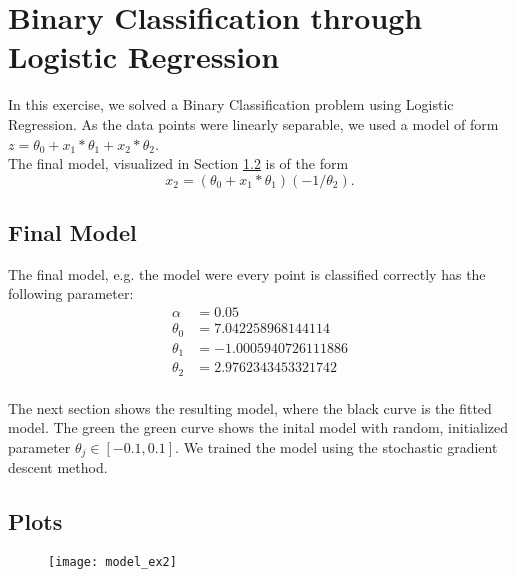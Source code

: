 \documentclass[a4paper,parskip=half-]{scrartcl}
\begin{document}
	\section{Binary Classification through Logistic Regression}
	In this exercise, we solved a Binary Classification problem using Logistic Regression.
	As the data points were linearly separable, we used a model of form $z = \theta_0 + x_1 *\theta_1 + x_2 * \theta_2$. \\The final model, visualized in Section \ref{plots} is of the form 
	$$x_2 = (\theta_0 + x_1 *\theta_1) (-1/\theta_2). $$
	\subsection{Final Model}
	
	The final model, e.g. the model were every point is classified correctly has the following parameter:
	\begin{align*}
		\alpha &= 0.05\\ 
		\theta_0 &= 7.042258968144114 \\
		\theta_1 &= -1.0005940726111886 \\
		\theta_2 &= 2.9762343453321742\\
	\end{align*}
	
	The next section shows the resulting model, where the black curve is the fitted model. The green the green curve shows the inital model with random, initialized parameter $\theta_j \in [-0.1,0.1]$. We trained the model using the stochastic gradient descent method. 
	
	\subsection{Plots}\label{plots}
	\begin{figure}[!h]
	\centering\texttt{[image: model\_ex2]}
	\end{figure}
\end{document}
